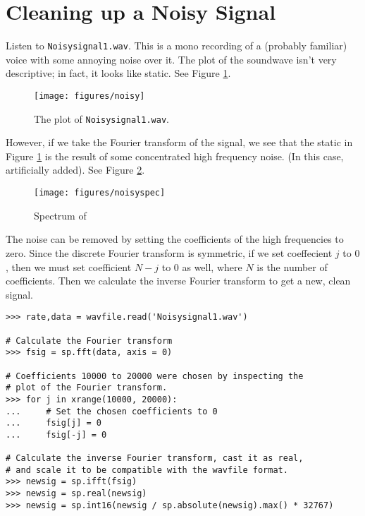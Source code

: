 

\section*{Cleaning up a Noisy Signal}

Listen to \texttt{Noisysignal1.wav}.
This is a mono recording of a (probably familiar) voice with some annoying noise over it.
The plot of the soundwave isn't very descriptive; in fact, it looks like static.
See Figure \ref{fig:noisysignal}.

\begin{figure}
\centering
\texttt{[image: figures/noisy]}
\caption{The plot of \texttt{Noisysignal1.wav}.}
\label{fig:noisysignal}
\end{figure}

However, if we take the Fourier transform of the signal, we see that the static in Figure \ref{fig:noisysignal} is the result of some concentrated high frequency noise.
(In this case, artificially added).
See Figure \ref{fig:noisyspec}.

\begin{figure}
\centering
\texttt{[image: figures/noisyspec]}
\caption{Spectrum of }
\label{fig:noisyspec}
\end{figure}

The noise can be removed by setting the coefficients of the high frequencies to zero.
Since the discrete Fourier transform is symmetric, if we set coeffecient $j$ to $0$, then we must set coefficient $N - j$ to $0$ as well, where $N$ is the number of coefficients.
Then we calculate the inverse Fourier transform to get a new, clean signal.

\begin{lstlisting}
>>> rate,data = wavfile.read('Noisysignal1.wav')

# Calculate the Fourier transform
>>> fsig = sp.fft(data, axis = 0)

# Coefficients 10000 to 20000 were chosen by inspecting the
# plot of the Fourier transform.
>>> for j in xrange(10000, 20000):
...     # Set the chosen coefficients to 0
...     fsig[j] = 0
...     fsig[-j] = 0

# Calculate the inverse Fourier transform, cast it as real,
# and scale it to be compatible with the wavfile format.
>>> newsig = sp.ifft(fsig)
>>> newsig = sp.real(newsig)
>>> newsig = sp.int16(newsig / sp.absolute(newsig).max() * 32767)
\end{lstlisting}

